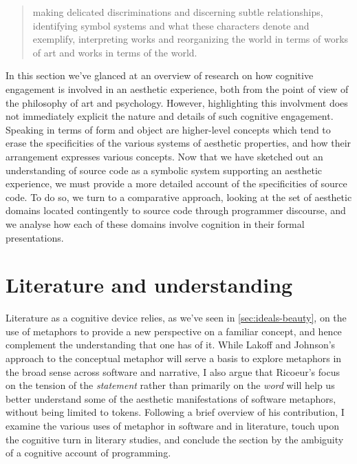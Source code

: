 \begin{quote}
    making delicated discriminations and discerning subtle relationships, identifying symbol systems and what these characters denote and exemplify, interpreting works and reorganizing the world in terms of works of art and works in terms of the world. \citep{goodman_languages_1976}
\end{quote}

\spacer

In this section we've glanced at an overview of research on how cognitive engagement is involved in an aesthetic experience, both from the point of view of the philosophy of art and psychology. However, highlighting this involvment does not immediately explicit the nature and details of such cognitive engagement. Speaking in terms of form and object are higher-level concepts which tend to erase the specificities of the various systems of aesthetic properties, and how their arrangement expresses various concepts. Now that we have sketched out an understanding of source code as a symbolic system supporting an aesthetic experience, we must provide a more detailed account of the specificities of source code. To do so, we turn to a comparative approach, looking at the set of aesthetic domains located contingently to source code through programmer discourse, and we analyse how each of these domains involve cognition in their formal presentations.


\section{Literature and understanding}
\label{sec:aesthetic-literature}

Literature as a cognitive device relies, as we've seen in \ref{sec:ideals-beauty}, on the use of metaphors to provide a new perspective on a familiar concept, and hence complement the understanding that one has of it. While Lakoff and Johnson's approach to the conceptual metaphor will serve a basis to explore metaphors in the broad sense across software and narrative, I also argue that Ricoeur's focus on the tension of the \emph{statement} rather than primarily on the \emph{word} will help us better understand some of the aesthetic manifestations of software metaphors, without being limited to tokens. Following a brief overview of his contribution, I examine the various uses of metaphor in software and in literature, touch upon the cognitive turn in literary studies, and conclude the section by the ambiguity of a cognitive account of programming.

